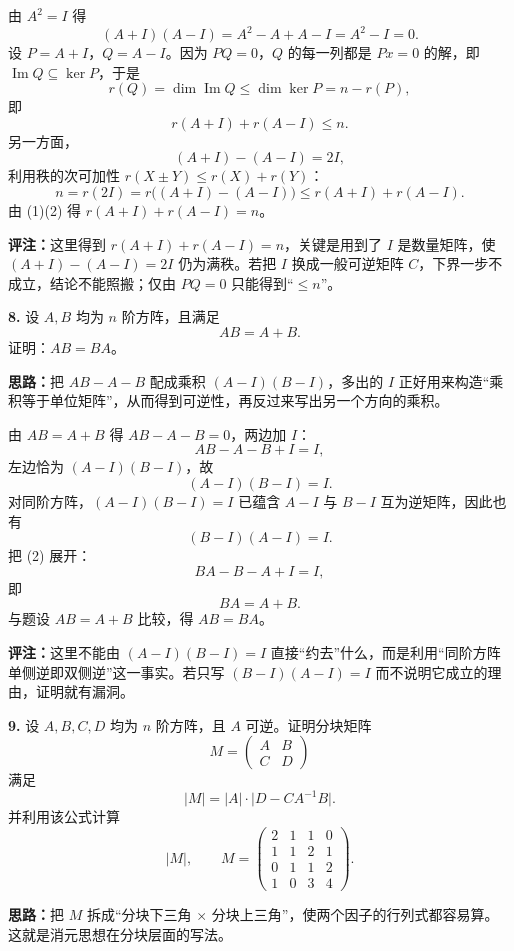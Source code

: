 由 \(A^2=I\) 得
\[
(A+I)(A-I)=A^2-A+A-I=A^2-I=0.
\]
设 \(P=A+I\)，\(Q=A-I\)。因为 \(PQ=0\)，\(Q\) 的每一列都是 \(Px=0\) 的解，即 \(\operatorname{Im}Q\subseteq\ker P\)，于是
\[
r(Q)=\dim\operatorname{Im}Q\le\dim\ker P=n-r(P),
\]
即
\[
r(A+I)+r(A-I)\le n. \tag{1}
\]
另一方面，
\[
(A+I)-(A-I)=2I,
\]
利用秩的次可加性 \(r(X\pm Y)\le r(X)+r(Y)\)：
\[
n=r(2I)=r\bigl((A+I)-(A-I)\bigr)\le r(A+I)+r(A-I). \tag{2}
\]
由 (1)(2) 得 \(r(A+I)+r(A-I)=n\)。

\textbf{评注：}这里得到 \(r(A+I)+r(A-I)=n\)，关键是用到了 \(I\) 是数量矩阵，使 \((A+I)-(A-I)=2I\) 仍为满秩。若把 \(I\) 换成一般可逆矩阵 \(C\)，下界一步不成立，结论不能照搬；仅由 \(PQ=0\) 只能得到“\(\le n\)”。

\else \answerarea[10] \fi%

\textbf{8.} 设 \(A,B\) 均为 \(n\) 阶方阵，且满足
\[
AB=A+B.
\]
证明：\(AB=BA\)。

\ifshowsolutions%
\textbf{思路：}把 \(AB-A-B\) 配成乘积 \((A-I)(B-I)\)，多出的 \(I\) 正好用来构造“乘积等于单位矩阵”，从而得到可逆性，再反过来写出另一个方向的乘积。

由 \(AB=A+B\) 得 \(AB-A-B=0\)，两边加 \(I\)：
\[
AB-A-B+I=I,
\]
左边恰为 \((A-I)(B-I)\)，故
\[
(A-I)(B-I)=I. \tag{1}
\]
对同阶方阵，\((A-I)(B-I)=I\) 已蕴含 \(A-I\) 与 \(B-I\) 互为逆矩阵，因此也有
\[
(B-I)(A-I)=I. \tag{2}
\]
把 (2) 展开：
\[
BA-B-A+I=I,
\]
即
\[
BA=A+B.
\]
与题设 \(AB=A+B\) 比较，得 \(AB=BA\)。

\textbf{评注：}这里不能由 \((A-I)(B-I)=I\) 直接“约去”什么，而是利用“同阶方阵单侧逆即双侧逆”这一事实。若只写 \((B-I)(A-I)=I\) 而不说明它成立的理由，证明就有漏洞。

\else \answerarea[8] \fi%

\textbf{9.} 设 \(A,B,C,D\) 均为 \(n\) 阶方阵，且 \(A\) 可逆。证明分块矩阵
\[
M=\begin{pmatrix}A&B\\C&D\end{pmatrix}
\]
满足
\[
|M|=|A|\cdot\bigl|D-CA^{-1}B\bigr|.
\]
并利用该公式计算
\[
|M|,\qquad
M=\begin{pmatrix}
2&1&1&0\\
1&1&2&1\\
0&1&1&2\\
1&0&3&4
\end{pmatrix}.
\]

\ifshowsolutions%
\textbf{思路：}把 \(M\) 拆成“分块下三角 \(\times\) 分块上三角”，使两个因子的行列式都容易算。这就是消元思想在分块层面的写法。

